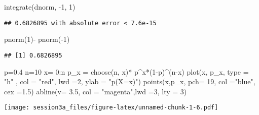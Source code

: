 \documentclass[
]{article}
\newenvironment{Shaded}{\begin{snugshade}}{\end{snugshade}}
\newcommand{\AttributeTok}[1]{\textcolor[rgb]{0.77,0.63,0.00}{#1}}
\newcommand{\DecValTok}[1]{\textcolor[rgb]{0.00,0.00,0.81}{#1}}
\newcommand{\FloatTok}[1]{\textcolor[rgb]{0.00,0.00,0.81}{#1}}
\newcommand{\FunctionTok}[1]{\textcolor[rgb]{0.00,0.00,0.00}{#1}}
\newcommand{\NormalTok}[1]{#1}
\newcommand{\OtherTok}[1]{\textcolor[rgb]{0.56,0.35,0.01}{#1}}
\newcommand{\SpecialCharTok}[1]{\textcolor[rgb]{0.00,0.00,0.00}{#1}}
\newcommand{\StringTok}[1]{\textcolor[rgb]{0.31,0.60,0.02}{#1}}
\begin{document}
\begin{Shaded}
\begin{Highlighting}[]
\FunctionTok{integrate}\NormalTok{(dnorm, }\SpecialCharTok{{-}}\DecValTok{1}\NormalTok{, }\DecValTok{1}\NormalTok{)}
\end{Highlighting}
\end{Shaded}

\begin{verbatim}
## 0.6826895 with absolute error < 7.6e-15
\end{verbatim}

\begin{Shaded}
\begin{Highlighting}[]
\FunctionTok{pnorm}\NormalTok{(}\DecValTok{1}\NormalTok{)}\SpecialCharTok{{-}} \FunctionTok{pnorm}\NormalTok{(}\SpecialCharTok{{-}}\DecValTok{1}\NormalTok{)}
\end{Highlighting}
\end{Shaded}

\begin{verbatim}
## [1] 0.6826895
\end{verbatim}

\begin{Shaded}
\begin{Highlighting}[]
\NormalTok{p}\OtherTok{=}\FloatTok{0.4}
\NormalTok{n}\OtherTok{=}\DecValTok{10}
\NormalTok{x}\OtherTok{=} \DecValTok{0}\SpecialCharTok{:}\NormalTok{n}
\NormalTok{p\_x }\OtherTok{=} \FunctionTok{choose}\NormalTok{(n, x)}\SpecialCharTok{*}\NormalTok{ p}\SpecialCharTok{\^{}}\NormalTok{x}\SpecialCharTok{*}\NormalTok{(}\DecValTok{1}\SpecialCharTok{{-}}\NormalTok{p)}\SpecialCharTok{\^{}}\NormalTok{(n}\SpecialCharTok{{-}}\NormalTok{x)}
\FunctionTok{plot}\NormalTok{(x, p\_x, }\AttributeTok{type =} \StringTok{"h"}\NormalTok{ , }\AttributeTok{col =} \StringTok{"red"}\NormalTok{, }\AttributeTok{lwd =}\DecValTok{2}\NormalTok{,}
     \AttributeTok{ylab =} \StringTok{"p(X=x)"}\NormalTok{)}
\FunctionTok{points}\NormalTok{(x,p\_x, }\AttributeTok{pch=} \DecValTok{19}\NormalTok{, }\AttributeTok{col =}\StringTok{"blue"}\NormalTok{, }\AttributeTok{cex =}\FloatTok{1.5}\NormalTok{)}
\FunctionTok{abline}\NormalTok{(}\AttributeTok{v=} \FloatTok{3.5}\NormalTok{, }\AttributeTok{col =} \StringTok{"magenta"}\NormalTok{,}\AttributeTok{lwd =}\DecValTok{3}\NormalTok{, }\AttributeTok{lty =} \DecValTok{3}\NormalTok{)}
\end{Highlighting}
\end{Shaded}

\texttt{[image: session3a\_files/figure-latex/unnamed-chunk-1-6.pdf]}
\end{document}
